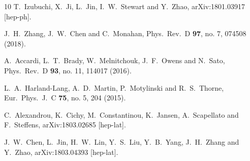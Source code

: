 \begin{thebibliography}{10}
  T.~Izubuchi, X.~Ji, L.~Jin, I.~W.~Stewart and Y.~Zhao,
  arXiv:1801.03917 [hep-ph].


  J.~H.~Zhang, J.~W.~Chen and C.~Monahan,
  Phys.\ Rev.\ D {\bf 97}, no. 7, 074508 (2018).


  A.~Accardi, L.~T.~Brady, W.~Melnitchouk, J.~F.~Owens and N.~Sato,
  Phys.\ Rev.\ D {\bf 93}, no. 11, 114017 (2016).


  L.~A.~Harland-Lang, A.~D.~Martin, P.~Motylinski and R.~S.~Thorne,
  Eur.\ Phys.\ J.\ C {\bf 75}, no. 5, 204 (2015).


  C.~Alexandrou, K.~Cichy, M.~Constantinou, K.~Jansen, A.~Scapellato and F.~Steffens,
  arXiv:1803.02685 [hep-lat].

  J.~W.~Chen, L.~Jin, H.~W.~Lin, Y.~S.~Liu, Y.~B.~Yang, J.~H.~Zhang and Y.~Zhao,
  arXiv:1803.04393 [hep-lat].

\end{thebibliography}
